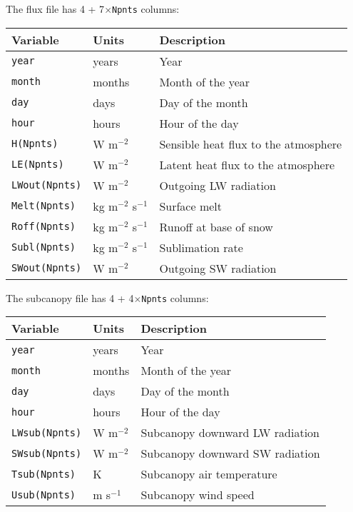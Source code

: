 \documentclass{article}
\begin{document}
The flux file has 4 + 7$\times${\tt Npnts} columns:
\begin{longtable}{|l|l|l|} \hline
Variable           & Units       & Description                          \\ \hline
{\tt year}         & years       & Year                                 \\
{\tt month}        & months      & Month of the year                    \\
{\tt day}          & days        & Day of the month                     \\
{\tt hour}         & hours       & Hour of the day                      \\
{\tt H(Npnts)}     & W m$^{-2}$  & Sensible heat flux to the atmosphere \\
{\tt LE(Npnts)}    & W m$^{-2}$  & Latent heat flux to the atmosphere   \\
{\tt LWout(Npnts)} & W m$^{-2}$  & Outgoing LW radiation                \\
{\tt Melt(Npnts)}  & kg m$^{-2}$ s$^{-1}$ & Surface melt                \\
{\tt Roff(Npnts)}  & kg m$^{-2}$ s$^{-1}$ & Runoff at base of snow      \\
{\tt Subl(Npnts)}  & kg m$^{-2}$ s$^{-1}$ & Sublimation rate            \\
{\tt SWout(Npnts)} & W m$^{-2}$  & Outgoing SW radiation                \\ \hline 
\end{longtable}

The subcanopy file has 4 + 4$\times${\tt Npnts} columns:
\begin{longtable}{|l|l|l|} \hline
Variable           & Units       & Description                          \\ \hline
{\tt year}         & years       & Year                                 \\
{\tt month}        & months      & Month of the year                    \\
{\tt day}          & days        & Day of the month                     \\
{\tt hour}         & hours       & Hour of the day                      \\
{\tt LWsub(Npnts)} & W m$^{-2}$  & Subcanopy downward LW radiation      \\
{\tt SWsub(Npnts)} & W m$^{-2}$  & Subcanopy downward SW radiation      \\
{\tt Tsub(Npnts)}  & K           & Subcanopy air temperature            \\
{\tt Usub(Npnts)}  & m s$^{-1}$  & Subcanopy wind speed                 \\ \hline 
\end{longtable}
\end{document}
